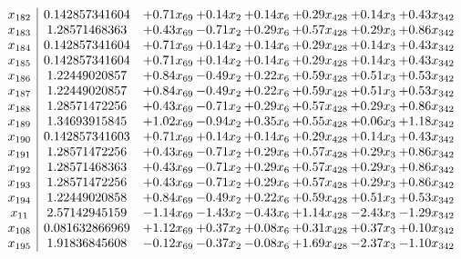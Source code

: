 \documentclass[8pt]{article}
\begin{document}
\[\begin{array}{c| c c@{\hskip 2pt} c@{\hskip 2pt} c@{\hskip 2pt} c@{\hskip 2pt} c@{\hskip 2pt} c@{\hskip 2pt} }
 x_{182}   &  0.142857341604 & +  0.71 x_{69} & +  0.14 x_{2} & +  0.14 x_{6} & +  0.29 x_{428} & +  0.14 x_{3} & +  0.43 x_{342}\\
 x_{183}   &  1.28571468363 & +  0.43 x_{69} & -0.71 x_{2} & +  0.29 x_{6} & +  0.57 x_{428} & +  0.29 x_{3} & +  0.86 x_{342}\\
 x_{184}   &  0.142857341604 & +  0.71 x_{69} & +  0.14 x_{2} & +  0.14 x_{6} & +  0.29 x_{428} & +  0.14 x_{3} & +  0.43 x_{342}\\
 x_{185}   &  0.142857341604 & +  0.71 x_{69} & +  0.14 x_{2} & +  0.14 x_{6} & +  0.29 x_{428} & +  0.14 x_{3} & +  0.43 x_{342}\\
 x_{186}   &  1.22449020857 & +  0.84 x_{69} & -0.49 x_{2} & +  0.22 x_{6} & +  0.59 x_{428} & +  0.51 x_{3} & +  0.53 x_{342}\\
 x_{187}   &  1.22449020857 & +  0.84 x_{69} & -0.49 x_{2} & +  0.22 x_{6} & +  0.59 x_{428} & +  0.51 x_{3} & +  0.53 x_{342}\\
 x_{188}   &  1.28571472256 & +  0.43 x_{69} & -0.71 x_{2} & +  0.29 x_{6} & +  0.57 x_{428} & +  0.29 x_{3} & +  0.86 x_{342}\\
 x_{189}   &  1.34693915845 & +  1.02 x_{69} & -0.94 x_{2} & +  0.35 x_{6} & +  0.55 x_{428} & +  0.06 x_{3} & +  1.18 x_{342}\\
 x_{190}   &  0.142857341603 & +  0.71 x_{69} & +  0.14 x_{2} & +  0.14 x_{6} & +  0.29 x_{428} & +  0.14 x_{3} & +  0.43 x_{342}\\
 x_{191}   &  1.28571472256 & +  0.43 x_{69} & -0.71 x_{2} & +  0.29 x_{6} & +  0.57 x_{428} & +  0.29 x_{3} & +  0.86 x_{342}\\
 x_{192}   &  1.28571468363 & +  0.43 x_{69} & -0.71 x_{2} & +  0.29 x_{6} & +  0.57 x_{428} & +  0.29 x_{3} & +  0.86 x_{342}\\
 x_{193}   &  1.28571472256 & +  0.43 x_{69} & -0.71 x_{2} & +  0.29 x_{6} & +  0.57 x_{428} & +  0.29 x_{3} & +  0.86 x_{342}\\
 x_{194}   &  1.22449020858 & +  0.84 x_{69} & -0.49 x_{2} & +  0.22 x_{6} & +  0.59 x_{428} & +  0.51 x_{3} & +  0.53 x_{342}\\
 x_{11}   &  2.57142945159 & -1.14 x_{69} & -1.43 x_{2} & -0.43 x_{6} & +  1.14 x_{428} & -2.43 x_{3} & -1.29 x_{342}\\
 x_{108}   &  0.081632866969 & +  1.12 x_{69} & +  0.37 x_{2} & +  0.08 x_{6} & +  0.31 x_{428} & +  0.37 x_{3} & +  0.10 x_{342}\\
 x_{195}   &  1.91836845608 & -0.12 x_{69} & -0.37 x_{2} & -0.08 x_{6} & +  1.69 x_{428} & -2.37 x_{3} & -1.10 x_{342}\\

\end{array}\]
\end{document}
